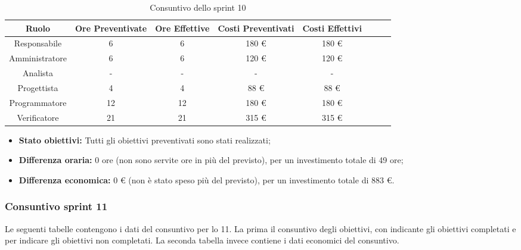 \begin{table}[H]
		\begin{center}
			\setlength{\aboverulesep}{0pt}
			\setlength{\belowrulesep}{0pt}
			\setlength{\extrarowheight}{.75ex}
			\begin{tabular}{ c c c c c c c c }
				\rowcolor{AzzurroGruppo!30} 
				\textbf{Ruolo} & \textbf{Ore Preventivate} & \textbf{Ore Effettive} & \textbf{Costi Preventivati} & \textbf{Costi Effettivi}\\
				\toprule
				Responsabile   & 6 & 6 & 180 \euro{}  & 180 \euro{}\\
				Amministratore & 6 & 6 & 120 \euro{}  & 120 \euro{} \\
				Analista       & - & - & - & - \\
				Progettista    & 4 & 4 & 88 \euro{} & 88 \euro{} \\
				Programmatore  & 12 & 12 & 180 \euro{}  & 180 \euro{} \\
				Verificatore   & 21 & 21 & 315 \euro{}  & 315 \euro{} \\
				\bottomrule
			\end{tabular}
			\caption{Consuntivo dello sprint 10}
		\end{center}
	\end{table}
	
\begin{itemize}
	\item \textbf{Stato obiettivi:} Tutti gli obiettivi preventivati sono stati realizzati;
	\item \textbf{Differenza oraria:} 0 ore (non sono servite ore in più del previsto), per un investimento totale di 49 ore;
	\item \textbf{Differenza economica:} 0 \euro{} (non è stato speso più del previsto), per un investimento totale di 883 \euro{}.
\end{itemize}


\subsubsection{Consuntivo sprint 11}
Le seguenti tabelle contengono i dati del consuntivo per lo  11. La prima il consuntivo degli obiettivi, con \checkmark{} indicante gli obiettivi completati e \xmark{} per indicare gli obiettivi non completati. La seconda tabella invece contiene i dati economici del consuntivo.\newline{}

